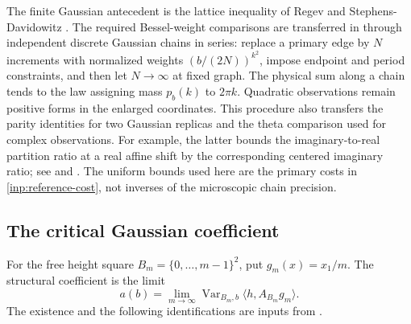 The finite Gaussian antecedent is the lattice inequality of Regev and
Stephens-Davidowitz \cite{RegevStephensDavidowitz2017}.  The required
Bessel-weight comparisons are transferred in \cite{X} through
independent discrete Gaussian chains in series: replace a primary edge by \(N\) increments
with normalized weights \((b/(2N))^{k^2}\), impose endpoint and period
constraints, and then let \(N\to\infty\) at fixed graph.  The physical
sum along a chain tends to the law assigning mass \(p_b(k)\) to
\(2\pi k\).  Quadratic observations remain positive
forms in the enlarged coordinates.  This procedure also transfers
the parity identities for two Gaussian replicas and the theta
comparison used for complex observations.  For example, the latter
bounds the imaginary-to-real partition ratio at a real affine shift
by the corresponding centered imaginary ratio;
see \cite[Equation (9.29)]{B} and
\cite[Equation (5.26)]{X}.  The uniform bounds used
here are the primary costs in \eqref{inp:reference-cost}, not inverses
of the microscopic chain precision.

\subsection{The critical Gaussian coefficient}

For the free height square \(B_m=\{0,\ldots,m-1\}^2\), put
\(g_m(x)=x_1/m\).  The structural coefficient is the limit
\[
 a(b)=\lim_{m\to\infty}
       \operatorname{Var}_{B_m,b}\langle h,A_{B_m}g_m\rangle.
\]
The existence and the following identifications are inputs from
\cite{X}.

